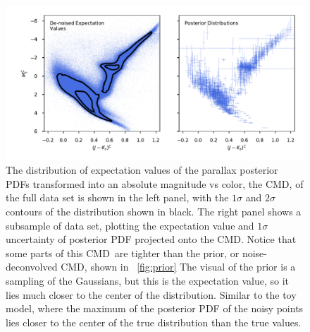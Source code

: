 \documentclass[modern]{aastex61}
\newcommand{\acronym}[1]{{\small{#1}}}
\newcommand{\cmd}{\acronym{CMD}}
\begin{document}
\begin{figure}
\centering
  \includegraphics[width=\textwidth]{posteriorCMD.pdf}
\caption{The distribution of expectation values of the parallax posterior PDFs transformed into an absolute magnitude vs color, the \cmd, of the full data set is shown in the left panel, with the $1\sigma$ and $2\sigma$ contours of the distribution shown in black.
The right panel shows a subsample of data set, plotting the expectation value and $1\sigma$ uncertainty of posterior PDF projected onto the \cmd.
Notice that some parts of this \cmd\ are tighter than the prior, or noise-deconvolved \cmd, shown in \figurename~\ref{fig:prior}
The visual of the prior is a sampling of the Gaussians, but this is the expectation
  value, so it lies much closer to the center of the
  distribution. Similar to the toy model, where the maximum of the
  posterior PDF of the noisy points lies closer to the center of the true distribution than the true values.}
\label{fig:posteriorCMD}
\end{figure}
\end{document}
